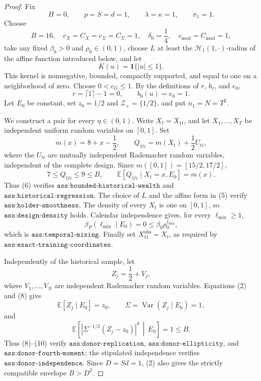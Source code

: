 \documentclass{article}
\begin{document}
\begin{proof}
Fix
\[
H=0,
\qquad p=S=d=1,
\qquad \lambda=\kappa=1,
\qquad \pi_1=1.
\tag{1}
\]
Choose
\[
B=16,
\quad c_X=C_X=c_\Sigma=C_\Sigma=1,
\quad \delta_0=\frac14,
\quad c_{\mathrm{mod}}=C_{\mathrm{mod}}=1,
\tag{2}
\]
take any fixed \(\beta_0>0\) and \(\rho_0\in(0,1)\), choose \(L\) at least the \(\mathcal H_1(1,\cdot)\)-radius of the affine function introduced below, and let
\[
K(u)=\mathbf 1\{|u|\le 1\}.
\tag{3}
\]
This kernel is nonnegative, bounded, compactly supported, and equal to one on a neighborhood of zero.  Choose \(0<c_G\le 1\).  By the definitions of \(r\), \(b_r\), and \(e_0\),
\[
r=\lceil 1\rceil-1=0,
\qquad b_0(u)=e_0=1.
\tag{4}
\]
Let \(E_0\) be constant, set \(z_0=1/2\) and \(\mathcal Z_+=\{1/2\}\), and put \(n_1=N=T^2\).

We construct a pair for every \(\eta\in(0,1)\).  Write \(X_t=X_{1t}\), and let \(X_1,\ldots,X_T\) be independent uniform random variables on \([0,1]\).  Set
\[
m(x)=8+x-\frac12,
\qquad
Q_{1ti}=m(X_t)+\frac12U_{ti},
\tag{5}
\]
where the \(U_{ti}\) are mutually independent Rademacher random variables, independent of the complete design.  Since \(m([0,1])=[15/2,17/2]\),
\[
7\le Q_{1ti}\le 9\le B,
\qquad
\mathbb E[Q_{1ti}\mid X_t=x,E_0]=m(x).
\tag{6}
\]
Thus (6) verifies \(\texttt{ass:bounded-historical-wealth}\) and \(\texttt{ass:historical-regression}\).  The choice of \(L\) and the affine form in (5) verify \(\texttt{ass:holder-smoothness}\).  The density of every \(X_t\) is one on \([0,1]\), so \(\texttt{ass:design-density}\) holds.  Calendar independence gives, for every \(\ell_{\mathrm{mix}}\ge1\),
\[
\beta_P(\ell_{\mathrm{mix}}\mid E_0)=0
\le \beta_0\rho_0^{\ell_{\mathrm{mix}}},
\tag{7}
\]
which is \(\texttt{ass:temporal-mixing}\).  Finally set \(X_{1t}^{\mathrm{obs}}=X_t\), as required by \(\texttt{ass:exact-training-coordinates}\).

Independently of the historical sample, let
\[
Z_j=\frac12+V_j,
\tag{8}
\]
where \(V_1,\ldots,V_N\) are independent Rademacher random variables.  Equations (2) and (8) give
\[
\mathbb E[Z_j\mid E_0]=z_0,
\qquad
\Sigma=\operatorname{Var}(Z_j\mid E_0)=1,
\tag{9}
\]
and
\[
\mathbb E\!\left[
\left|\Sigma^{-1/2}(Z_j-z_0)\right|^4\,\middle|\,E_0
\right]=1\le B.
\tag{10}
\]
Thus (8)--(10) verify \(\texttt{ass:donor-replication}\), \(\texttt{ass:donor-ellipticity}\), and \(\texttt{ass:donor-fourth-moment}\); the stipulated independence verifies \(\texttt{ass:donor-independence}\).  Since \(D=Sd=1\), (2) also gives the strictly compatible envelope \(B>D^2\).


\end{proof}
\end{document}
